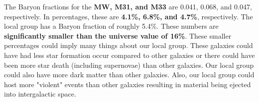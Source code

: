 \documentclass[12pt]{article}
\begin{document}
\begin{enumerate}
\noindent The Baryon fractions for the \textbf{MW, M31, and M33} are 0.041, 0.068, and 0.047, respectively. In percentages, these are \textbf{4.1\%, 6.8\%, and 4.7\%}, respectively. The local group has a Baryon fraction of roughly 5.4\%. These numbers are \textbf{significantly smaller than the universe value of 16\%}. These smaller percentages could imply many things about our local group. These galaxies could have had less star formation occur compared to other galaxies or there could have been more star death (including supernovae) than other galaxies. Our local group could also have more dark matter than other galaxies. Also, our local group could host more "violent" events than other galaxies resulting in material being ejected into intergalactic space.

\end{enumerate}
\end{document}
